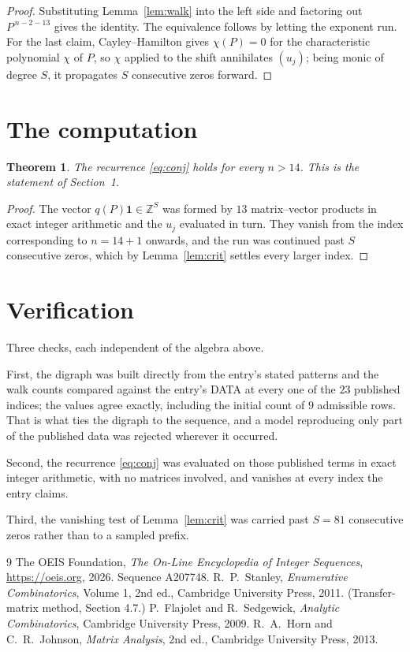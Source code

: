 \documentclass[11pt,a4paper]{article}
\theoremstyle{plain}
\newtheorem{theorem}{Theorem}
\theoremstyle{definition}
\begin{document}
\begin{proof}
Substituting Lemma~\ref{lem:walk} into the left side and factoring out
$P^{\,n-2-13}$ gives the identity. The equivalence follows by letting the exponent
run. For the last claim, Cayley--Hamilton gives $\chi(P)=0$ for the characteristic
polynomial $\chi$ of $P$, so $\chi$ applied to the shift annihilates $(u_j)$; being monic of
degree $S$, it propagates $S$ consecutive zeros forward.
\end{proof}

\section{The computation}

\begin{theorem}
The recurrence \eqref{eq:conj} holds for every $n>14$. This is the statement of
Section~1.
\end{theorem}

\begin{proof}
The vector $q(P)\mathbf{1}\in\mathbb{Z}^{S}$ was formed by $13$ matrix--vector
products in exact integer arithmetic and the $u_j$ evaluated in turn. They vanish from the
index corresponding to $n=14+1$ onwards, and the run was continued past $S$ consecutive
zeros, which by Lemma~\ref{lem:crit} settles every larger index.
\end{proof}

\section{Verification}

Three checks, each independent of the algebra above.

First, the digraph was built directly from the entry's stated patterns and the walk counts
compared against the entry's DATA at every one of the $23$ published indices; the
values agree exactly, including the initial count of $9$ admissible rows. That is
what ties the digraph to the sequence, and a model reproducing only part of the published
data was rejected wherever it occurred.

Second, the recurrence \eqref{eq:conj} was evaluated on those published terms in exact
integer arithmetic, with no matrices involved, and vanishes at every index the entry claims.

Third, the vanishing test of Lemma~\ref{lem:crit} was carried past $S=81$ consecutive
zeros rather than to a sampled prefix.

\begin{thebibliography}{9}
 The OEIS Foundation, \emph{The On-Line Encyclopedia of Integer
Sequences}, \url{https://oeis.org}, 2026. Sequence A207748.
 R.~P.~Stanley, \emph{Enumerative Combinatorics}, Volume 1, 2nd ed.,
Cambridge University Press, 2011. (Transfer-matrix method, Section 4.7.)
 P.~Flajolet and R.~Sedgewick, \emph{Analytic Combinatorics}, Cambridge
University Press, 2009.
 R.~A.~Horn and C.~R.~Johnson, \emph{Matrix Analysis}, 2nd ed., Cambridge
University Press, 2013.
\end{thebibliography}
\end{document}

